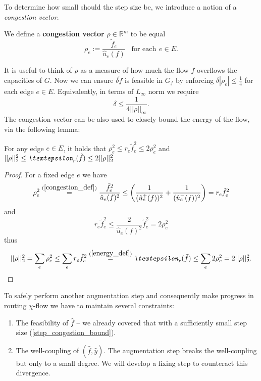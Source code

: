 To determine how small should the step size be, we introduce a notion of a \textit{congestion vector}.
\begin{definition}
We define a \textbf{congestion vector} $\rho\in\mathbb{R}^m$ to be equal
\begin{equation} \label{congestion_def}
\rho_e := \frac{\tilde  f_e}{\hat u_e(f)} \hspace{10pt}\text{for each}\hspace{5pt}e\in E.
\end{equation}
\end{definition}
It is useful to think of $\rho$ as a measure of how much the flow $f$ overflows the capacities of $G$.
Now we can ensure $\delta\tilde  f$ is feasible in $G_f$ by enforcing $\delta|\rho_e| \le \frac{1}{4}$ for each edge $e\in E$. Equivalently, in terms of $L_\infty$ norm we require
\begin{equation} \label{step_congestion_bound}
\delta \le \frac{1}{4||\rho||_\infty}.
\end{equation}
The congestion vector can be also used to closely bound the energy of the flow, via the following lemma:
\begin{lemma} \label{congestion_energy_bound}
For any edge $e\in E$, it holds that $\rho_e^2\le r_e \tilde f_e^2 \le 2\rho_e^2$ and
$ ||\rho||_2^2\le\emph{\textepsilon}_r(\tilde  f)\le2||\rho||_2^2 $
\end{lemma}
\begin{proof}
For a fixed edge $e$ we have
\[
\rho_e^2
\stackrel{(\ref{congestion_def})}{=} \frac{\tilde  f_e^2}{\hat u_e(f)^2}
\le \left(\frac{1}{(\hat u_e^+(f))^2}+\frac{1}{(\hat u_e^-(f))^2}\right)
= r_e\tilde f_e^2
\]
and
\[
r_e\tilde  f_e^2
\le \frac{2}{\hat u_e(f)^2}\tilde  f_e^2
= 2\rho^2_e
\]
thus
\[
||\rho||_2^2
= \sum_e \rho_e^2
\le \sum_e r_e\tilde  f_e^2
\stackrel{(\ref{energy_def})}{=} \emph{\textepsilon}_r(\tilde  f)
\le \sum_e 2\rho_e^2
= 2||\rho||_2^2.
\]
\end{proof}

To safely perform another augmentation step and consequently make progress in routing $\chi$-flow we have to maintain several constraints:
\begin{enumerate}
    \item The feasibility of $\hat f$ -- we already covered that with a sufficiently small step size (\ref{step_congestion_bound}).
    \item The well-coupling of $(\hat f,\hat y)$. The augmentation step breaks the well-coupling but only to a small degree. We will develop a fixing step to counteract this divergence. 
\end{enumerate}

